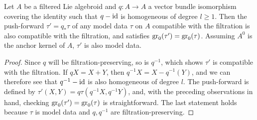 \documentclass[leqno,12pt]{amsart} %
\begin{document}
\begin{lemma}
  Let $A$ be a filtered Lie algebroid and $q \colon A \rightarrow A$ a vector bundle
  isomorphism covering the identity such that $q - \mathrm{id}$ is homogeneous of degree
  $l\ge 1$. Then the push-forward $\tau' = q_*\tau $ of any model data $\tau $ on $A$
  compatible with the filtration is also compatible with the filtration, and satisfies
  $\operatorname{\operatorname{gr}}_0(\tau')=\operatorname{\operatorname{gr}}_0(\tau)$. Assuming $A^0$ is the anchor kernel of $A$, $\tau'$
  is also model data.
\end{lemma}
\begin{proof}
  Since $q$ will be filtration-preserving, so is $q^{-1}$, which shows $\tau' $ is
  compatible with the filtration. If $qX = X + Y$, then $q^{-1}X = X - q^{-1}(Y)$, and we
  can therefore see that $q^{-1} - \mathrm{id}$ is also homogeneous of degree $l$. The
  push-forward is defined by $\tau'(X, Y) = q \tau (q^{-1}X, q^{-1}Y)$, and, with the
  preceding observations in hand, checking $\operatorname{\operatorname{gr}}_0(\tau') = \operatorname{\operatorname{gr}}_0(\tau)$ is
  straightforward. The last statement holds because $\tau $ is model data and $q, q^{-1}$
  are filtration-preserving.
\end{proof}
\end{document}

